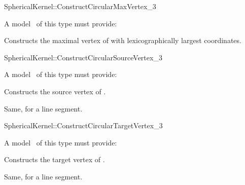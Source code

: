 \begin{ccRefFunctionObjectConcept}{SphericalKernel::ConstructCircularMaxVertex_3} 


A model \ccVar\ of this type must provide:


{Constructs the maximal vertex of  with lexicographically 
largest coordinates.}

\end{ccRefFunctionObjectConcept}
\begin{ccRefFunctionObjectConcept}{SphericalKernel::ConstructCircularSourceVertex_3} 


A model \ccVar\ of this type must provide:

{Constructs the source vertex of .}

{Same, for a line segment.}

\end{ccRefFunctionObjectConcept}
\begin{ccRefFunctionObjectConcept}{SphericalKernel::ConstructCircularTargetVertex_3} 


A model \ccVar\ of this type must provide:

{Constructs the target vertex of .}

{Same, for a line segment.}

\end{ccRefFunctionObjectConcept}
